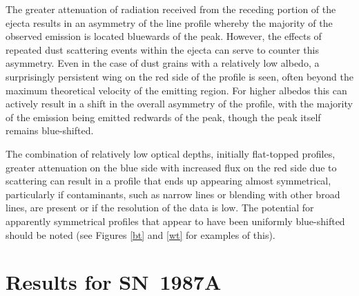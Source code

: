 \documentclass[useAMS,usenatbib,usegraphicx]{mnras}
\begin{document}
The greater attenuation of radiation received from the receding portion of 
the ejecta results in an asymmetry of the line profile whereby the 
majority of the observed emission is located bluewards of the peak.  
However, the effects of repeated dust scattering events within the 
ejecta can serve to counter this asymmetry.  Even in the case of dust grains 
with a relatively low albedo, a surprisingly persistent wing on the red 
side of the profile is seen, often beyond the maximum theoretical velocity 
of the emitting region.  For higher albedos this can actively result in a 
shift in the overall asymmetry of the profile, with the majority of the 
emission being emitted redwards of the peak, though the peak itself 
remains blue-shifted.


The combination of relatively low optical depths, initially flat-topped 
profiles, greater attenuation on the blue side with increased flux on the 
red side due to scattering can result in a profile that ends up appearing 
almost symmetrical, particularly if 
contaminants, such as narrow lines or blending with other broad lines, are 
present or if the resolution of the data is low.  The potential for apparently 
symmetrical profiles that appear to have been uniformly blue-shifted 
should be noted (see Figures \ref{bt} and \ref{wt} for examples of this).


\section{Results for SN~1987A}
\label{results}
\end{document}
